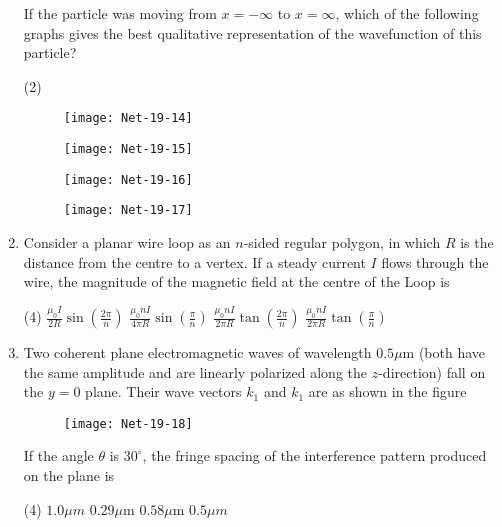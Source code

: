 \begin{enumerate}
\begin{figure}[H]
\end{figure}
If the particle was moving from $x=-\infty$ to $x=\infty$, which of the following graphs gives the best qualitative representation of the wavefunction of this particle?
 \begin{tasks}(2)
	\task[\textbf{a.}]
	\begin{figure}[H]
		\centering
		\texttt{[image: Net-19-14]}
	\end{figure}
	\task[\textbf{b.}]
		\begin{figure}[H]
		\centering
		\texttt{[image: Net-19-15]}
	\end{figure}
	\task[\textbf{c.}]
		\begin{figure}[H]
		\centering
		\texttt{[image: Net-19-16]}
	\end{figure}
	\task[\textbf{d.}] 
		\begin{figure}[H]
		\centering
		\texttt{[image: Net-19-17]}
	\end{figure}
\end{tasks}
\item  Consider a planar wire loop as an $n$-sided regular polygon, in which $R$ is the distance from the centre to a vertex. If a steady current $I$ flows through the wire, the magnitude of the magnetic field at the centre of the Loop is
 \begin{tasks}(4)
	\task[\textbf{a.}]$\frac{\mu_{0} I}{2 R} \sin \left(\frac{2 \pi}{n}\right)$
	\task[\textbf{b.}] $\frac{\mu_{0} n I}{4 \pi R} \sin \left(\frac{\pi}{n}\right)$
	\task[\textbf{c.}]$\frac{\mu_{0} n I}{2 \pi R} \tan \left(\frac{2 \pi}{n}\right)$
	\task[\textbf{d.}] $\frac{\mu_{0} n I}{2 \pi R} \tan \left(\frac{\pi}{n}\right)$
\end{tasks}
\item  Two coherent plane electromagnetic waves of wavelength $0.5 \mu \mathrm{m}$ (both have the same amplitude and are linearly polarized along the $z$-direction) fall on the $y=0$ plane. Their wave vectors $k_{1}$ and $k_{1}$ are as shown in the figure
\begin{figure}[H]
	\centering
	\texttt{[image: Net-19-18]}
\end{figure}
If the angle $\theta$ is $30^{\circ}$, the fringe spacing of the interference pattern produced on the plane is
 \begin{tasks}(4)
	\task[\textbf{a.}]$1.0 \mu m$
	\task[\textbf{b.}]$0.29 \mu \mathrm{m}$
	\task[\textbf{c.}]$0.58 \mu \mathrm{m}$
	\task[\textbf{d.}]$0.5 \mu m$ 

\end{tasks}
\end{enumerate}
